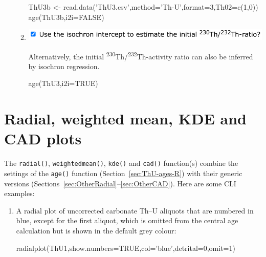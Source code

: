 \begin{refsection}
\begin{enumerate}
\begin{enumerate}
\begin{script}
ThU3b <- read.data('ThU3.csv',method='Th-U',format=3,Th02=c(1,0))
age(ThU3b,i2i=FALSE)
\end{script}

    
\item\begin{minipage}[t]{.7\linewidth}
    \strut\vspace*{-\baselineskip}\newline
    \includegraphics[width=\linewidth]{../figures/ThUi2i.png}
  \end{minipage}
    \begin{minipage}[t]{.3\linewidth}
      Alternatively, the initial
      \textsuperscript{230}Th/\textsuperscript{232}Th-activity ratio
      can also be inferred by isochron regression.\\
    \end{minipage}    

\begin{console}
age(ThU3,i2i=TRUE)
\end{console}

  \end{enumerate}
  
\end{enumerate}

\section{Radial, weighted mean, KDE and CAD plots}

The \texttt{radial()}, \texttt{weightedmean()}, \texttt{kde()} and
\texttt{cad()} function(s) combine the settings of the \texttt{age()}
function (Section~\ref{sec:ThU-ages-R}) with their generic versions
(Sections~\ref{sec:OtherRadial}--\ref{sec:OtherCAD}). Here are some
CLI examples:

\begin{enumerate}

\item A radial plot of uncorrected carbonate Th--U aliquots that are
  numbered in blue, except for the first aliquot, which is omitted
  from the central age calculation but is shown in the default grey
  colour:
  
\begin{console}
radialplot(ThU1,show.numbers=TRUE,col='blue',detrital=0,omit=1)
\end{console}


\end{enumerate}
\end{refsection}
